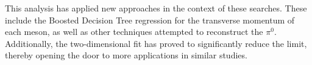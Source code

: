 This analysis has applied new approaches in the context of these searches. These include the Boosted Decision Tree regression for the transverse momentum of each meson, as well as other techniques attempted to reconstruct the $\pi^0$. Additionally, the two-dimensional fit has proved to significantly reduce the limit, thereby opening the door to more applications in similar studies.

\clearpage{\thispagestyle{empty}}
